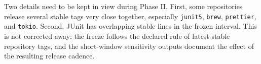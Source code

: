 Two details need to be kept in view during Phase II. First, some repositories release several
stable tags very close together, especially \texttt{junit5}, \texttt{brew}, \texttt{prettier},
and \texttt{tokio}. Second, JUnit has overlapping stable lines in the frozen interval. This is
not corrected away: the freeze follows the declared rule of latest stable repository tags, and
the short-window sensitivity outputs document the effect of the resulting release cadence.
